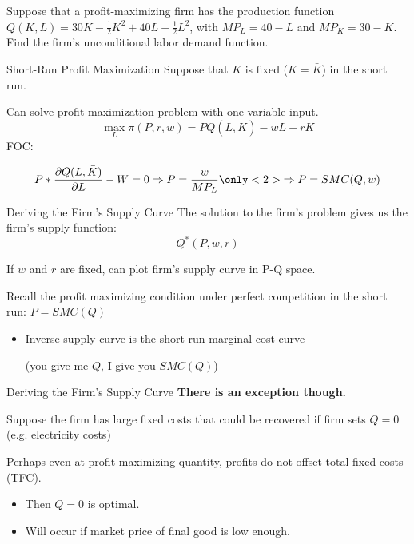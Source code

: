 \documentclass[11pt,t]{beamer}
\begin{document}
\begin{frame}{}
  Suppose that a profit-maximizing firm has the production function $Q(K,L) = 30K-\frac{1}{2}K^2+40L-\frac{1}{2}L^2$, with $MP_L = 40-L$ and $MP_K=30-K$.  Find the firm's unconditional labor demand function.
\end{frame}

\frame

\begin{frame}{Short-Run Profit Maximization}
  Suppose that $K$ is fixed ($K = \bar{K}$) in the short run.

  Can solve profit maximization problem with one variable input.
  $$
    \max_{L}\pi(P,r,w) = PQ(L,\bar{K}) - wL - r\bar{K}
  $$
  FOC: 
  
  $$
    P * \frac{\partial Q(L, \bar{K})}{\partial L} - W = 0 \Rightarrow P = \frac{w}{MP_L} \only<2>{\Rightarrow P = SMC(Q,w)}
  $$

  \bigskip
\end{frame}

\begin{frame}{Deriving the Firm's Supply Curve}
  The solution to the firm's problem gives us the firm's supply function:
  $$
    Q^*(P,w,r)
  $$

  \bigskip
  If $w$ and $r$ are fixed, can plot firm's supply curve in P-Q space.

  \bigskip\pause
  Recall the profit maximizing condition under perfect competition in the short run: $P = SMC(Q)$

  \begin{itemize}
    \item Inverse supply curve is the short-run marginal cost curve 
    
    (you give me $Q$, I give you $SMC(Q)$)
  \end{itemize}
\end{frame}

\begin{frame}{Deriving the Firm's Supply Curve}
  \textbf{There is an exception though.}

  \bigskip\pause
  Suppose the firm has large fixed costs that could be recovered if firm sets $Q = 0$ (e.g. electricity costs)

  \smallskip
  Perhaps even at profit-maximizing quantity, profits do not offset total fixed costs (TFC).
  \begin{itemize}
    \item Then $Q=0$ is optimal.
    \item Will occur if market price of final good is low enough.
  \end{itemize}
\end{frame}
\end{document}
